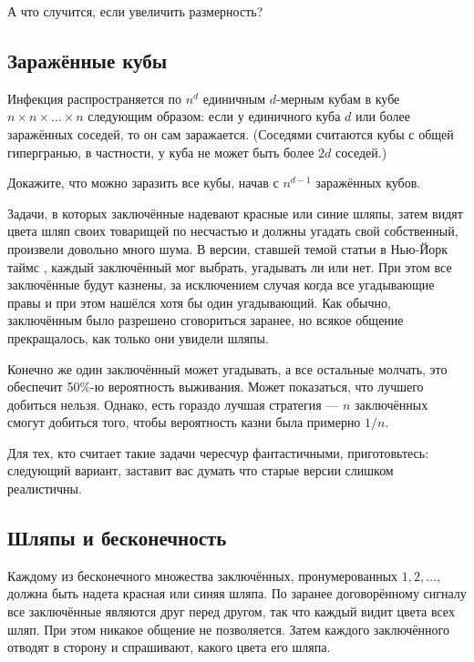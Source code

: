 А что случится, если увеличить размерность?

\subsection*{Заражённые кубы}

Инфекция распространяется по $n^d$ единичным $d$-мерным кубам в кубе $n \times n \times \dots \times n$ следующим образом: если у единичного куба $d$ или более заражённых соседей, то он сам заражается.
(Соседями считаются кубы с общей гипергранью, в частности, у куба не может быть более $2d$ соседей.)

Докажите, что можно заразить все кубы, начав с $n^{d-1}$ заражённых кубов.

\medskip

Задачи, в которых заключённые надевают красные или синие шляпы, затем видят цвета шляп своих товарищей по несчастью и должны угадать свой собственный, произвели довольно много шума.
В версии, ставшей темой статьи в Нью-Йорк таймс \cite{50}, каждый заключённый мог выбрать, угадывать ли или нет.
При этом все заключённые будут казнены, за исключением случая когда все угадывающие правы и при этом нашёлся хотя бы один угадывающий.
Как обычно, заключённым было разрешено сговориться заранее, но всякое общение прекращалось, как только они увидели шляпы.

Конечно же один заключённый может угадывать, а все остальные молчать,
это обеспечит 50\%-ю вероятность выживания. 
Может показаться, что лучшего добиться нельзя.
Однако, есть гораздо лучшая стратегия --- $n$ заключённых смогут добиться того, чтобы вероятность казни была примерно $1/n$.

Для тех, кто считает такие задачи чересчур фантастичными, приготовьтесь:
следующий вариант, заставит вас думать что старые версии слишком реалистичны.

\subsection*{Шляпы и бесконечность}\label{Шляпы и бесконечность}

Каждому из бесконечного множества заключённых, пронумерованных $1,2,\dots$, должна быть надета красная или синяя шляпа.
По заранее договорённому сигналу все заключённые являются друг перед другом, так что каждый видит цвета всех шляп.
При этом никакое общение не позволяется.
Затем каждого заключённого отводят в сторону и спрашивают, какого цвета его шляпа.

